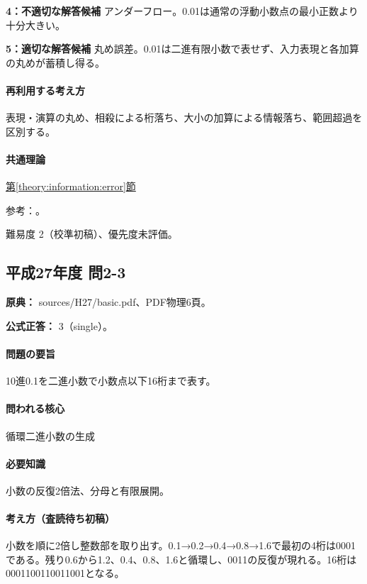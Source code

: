 \noindent\textbf{4：不適切な解答候補} アンダーフロー。0.01は通常の浮動小数点の最小正数より十分大きい。\par

\noindent\textbf{5：適切な解答候補} 丸め誤差。0.01は二進有限小数で表せず、入力表現と各加算の丸めが蓄積し得る。\par

\paragraph{再利用する考え方} 表現・演算の丸め、相殺による桁落ち、大小の加算による情報落ち、範囲超過を区別する。

\paragraph{共通理論} \hyperref[theory:information:error]{第\ref*{theory:information:error}節}

\par 参考：\cite{goldberg1991}。

\par 難易度 2（校準初稿）、優先度未評価。

\subsection{平成27年度 問2-3}
\label{q:h27-reg-basic-2-3}

\noindent\textbf{原典：} sources/H27/basic.pdf、PDF物理6頁。

\textbf{公式正答：} 3（single）。

\paragraph{問題の要旨} 10進0.1を二進小数で小数点以下16桁まで表す。

\paragraph{問われる核心} 循環二進小数の生成

\paragraph{必要知識} 小数の反復2倍法、分母と有限展開。

\paragraph{考え方（査読待ち初稿）} 小数を順に2倍し整数部を取り出す。0.1→0.2→0.4→0.8→1.6で最初の4桁は0001である。残り0.6から1.2、0.4、0.8、1.6と循環し、0011の反復が現れる。16桁は0001100110011001となる。

